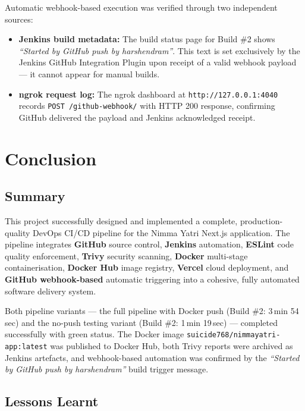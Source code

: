 \documentclass[12pt,a4paper,oneside]{report}
\begin{document}
Automatic webhook-based execution was verified through two independent sources:

\begin{itemize}
  \item \textbf{Jenkins build metadata:} The build status page for Build \#2 shows
        \emph{``Started by GitHub push by harshendram''}. This text is set
        exclusively by the Jenkins GitHub Integration Plugin upon receipt of a valid
        webhook payload --- it cannot appear for manual builds.
  \item \textbf{ngrok request log:} The ngrok dashboard at
        \texttt{http://127.0.0.1:4040} records
        \texttt{POST /github-webhook/} with HTTP 200 response, confirming GitHub
        delivered the payload and Jenkins acknowledged receipt.
\end{itemize}

\chapter{Conclusion}

\section{Summary}

This project successfully designed and implemented a complete, production-quality
DevOps CI/CD pipeline for the Nimma Yatri Next.js application. The pipeline
integrates \textbf{GitHub} source control, \textbf{Jenkins} automation,
\textbf{ESLint} code quality enforcement, \textbf{Trivy} security scanning,
\textbf{Docker} multi-stage containerisation, \textbf{Docker Hub} image registry,
\textbf{Vercel} cloud deployment, and \textbf{GitHub webhook-based} automatic
triggering into a cohesive, fully automated software delivery system.

Both pipeline variants --- the full pipeline with Docker push (Build \#2: 3\,min
54\,sec) and the no-push testing variant (Build \#2: 1\,min 19\,sec) --- completed
successfully with green status. The Docker image \texttt{suicide768/nimmayatri-app:latest}
was published to Docker Hub, both Trivy reports were archived as Jenkins artefacts,
and webhook-based automation was confirmed by the \emph{``Started by GitHub push by
harshendram''} build trigger message.

\section{Lessons Learnt}
\end{document}
